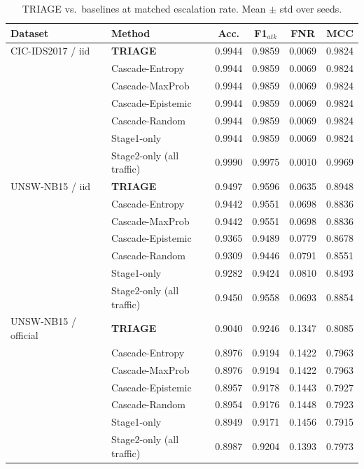 \begin{table}[t]
\centering
\small
\caption{TRIAGE vs.\ baselines at matched escalation rate. Mean $\pm$ std over seeds.}
\begin{tabular}{llcccc}
\toprule
Dataset & Method & Acc. & F1$_{atk}$ & FNR & MCC \\
\midrule
CIC-IDS2017 / iid & \textbf{TRIAGE} & 0.9944 & 0.9859 & 0.0069 & 0.9824 \\
 & Cascade-Entropy & 0.9944 & 0.9859 & 0.0069 & 0.9824 \\
 & Cascade-MaxProb & 0.9944 & 0.9859 & 0.0069 & 0.9824 \\
 & Cascade-Epistemic & 0.9944 & 0.9859 & 0.0069 & 0.9824 \\
 & Cascade-Random & 0.9944 & 0.9859 & 0.0069 & 0.9824 \\
 & Stage1-only & 0.9944 & 0.9859 & 0.0069 & 0.9824 \\
 & Stage2-only (all traffic) & 0.9990 & 0.9975 & 0.0010 & 0.9969 \\
\midrule
UNSW-NB15 / iid & \textbf{TRIAGE} & 0.9497 & 0.9596 & 0.0635 & 0.8948 \\
 & Cascade-Entropy & 0.9442 & 0.9551 & 0.0698 & 0.8836 \\
 & Cascade-MaxProb & 0.9442 & 0.9551 & 0.0698 & 0.8836 \\
 & Cascade-Epistemic & 0.9365 & 0.9489 & 0.0779 & 0.8678 \\
 & Cascade-Random & 0.9309 & 0.9446 & 0.0791 & 0.8551 \\
 & Stage1-only & 0.9282 & 0.9424 & 0.0810 & 0.8493 \\
 & Stage2-only (all traffic) & 0.9450 & 0.9558 & 0.0693 & 0.8854 \\
\midrule
UNSW-NB15 / official & \textbf{TRIAGE} & 0.9040 & 0.9246 & 0.1347 & 0.8085 \\
 & Cascade-Entropy & 0.8976 & 0.9194 & 0.1422 & 0.7963 \\
 & Cascade-MaxProb & 0.8976 & 0.9194 & 0.1422 & 0.7963 \\
 & Cascade-Epistemic & 0.8957 & 0.9178 & 0.1443 & 0.7927 \\
 & Cascade-Random & 0.8954 & 0.9176 & 0.1448 & 0.7923 \\
 & Stage1-only & 0.8949 & 0.9171 & 0.1456 & 0.7915 \\
 & Stage2-only (all traffic) & 0.8987 & 0.9204 & 0.1393 & 0.7973 \\
\bottomrule
\end{tabular}
\label{tab:main}
\end{table}